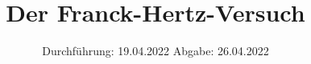 

\subject{V601}
\title{Der Franck-Hertz-Versuch}
\date{%
  Durchführung: 19.04.2022
  \hspace{3em}
  Abgabe: 26.04.2022
}



\maketitle
\thispagestyle{empty}
\tableofcontents
\newpage






\printbibliography{}


